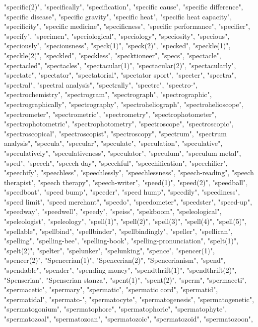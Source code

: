 "specific(2)",
"specifically",
"specification",
"specific cause",
"specific difference",
"specific disease",
"specific gravity",
"specific heat",
"specific heat capacity",
"specificity",
"specific medicine",
"specificness",
"specific performance",
"specifier",
"specify",
"specimen",
"speciological",
"speciology",
"speciosity",
"specious",
"speciously",
"speciousness",
"speck(1)",
"speck(2)",
"specked",
"speckle(1)",
"speckle(2)",
"speckled",
"speckless",
"specktioneer",
"specs",
"spectacle",
"spectacled",
"spectacles",
"spectacular(1)",
"spectacular(2)",
"spectacularly",
"spectate",
"spectator",
"spectatorial",
"spectator sport",
"specter",
"spectra",
"spectral",
"spectral analysis",
"spectrally",
"spectre",
"spectro-",
"spectrochemistry",
"spectrogram",
"spectrograph",
"spectrographic",
"spectrographically",
"spectrography",
"spectroheliograph",
"spectrohelioscope",
"spectrometer",
"spectrometric",
"spectrometry",
"spectrophotometer",
"spectrophotometric",
"spectrophotometry",
"spectroscope",
"spectroscopic",
"spectroscopical",
"spectroscopist",
"spectroscopy",
"spectrum",
"spectrum analysis",
"specula",
"specular",
"speculate",
"speculation",
"speculative",
"speculatively",
"speculativeness",
"speculator",
"speculum",
"speculum metal",
"sped",
"speech",
"speech day",
"speechful",
"speechification",
"speechifier",
"speechify",
"speechless",
"speechlessly",
"speechlessness",
"speech-reading",
"speech therapist",
"speech therapy",
"speech-writer",
"speed(1)",
"speed(2)",
"speedball",
"speedboat",
"speed bump",
"speeder",
"speed hump",
"speedily",
"speediness",
"speed limit",
"speed merchant",
"speedo",
"speedometer",
"speedster",
"speed-up",
"speedway",
"speedwell",
"speedy",
"speiss",
"spekboom",
"speleological",
"speleologist",
"speleology",
"spell(1)",
"spell(2)",
"spell(3)",
"spell(4)",
"spell(5)",
"spellable",
"spellbind",
"spellbinder",
"spellbindingly",
"speller",
"spellican",
"spelling",
"spelling-bee",
"spelling-book",
"spelling-pronunciation",
"spelt(1)",
"spelt(2)",
"spelter",
"spelunker",
"spelunking",
"spence",
"spencer(1)",
"spencer(2)",
"Spencerian(1)",
"Spencerian(2)",
"Spencerianism",
"spend",
"spendable",
"spender",
"spending money",
"spendthrift(1)",
"spendthrift(2)",
"Spenserian",
"Spenserian stanza",
"spent(1)",
"spent(2)",
"sperm",
"spermaceti",
"spermacetic",
"spermary",
"spermatic",
"spermatic cord",
"spermatid",
"spermatidal",
"spermato-",
"spermatocyte",
"spermatogenesis",
"spermatogenetic",
"spermatogonium",
"spermatophore",
"spermatophoric",
"spermatophyte",
"spermatozoal",
"spermatozoan",
"spermatozoic",
"spermatozoid",
"spermatozoon",
